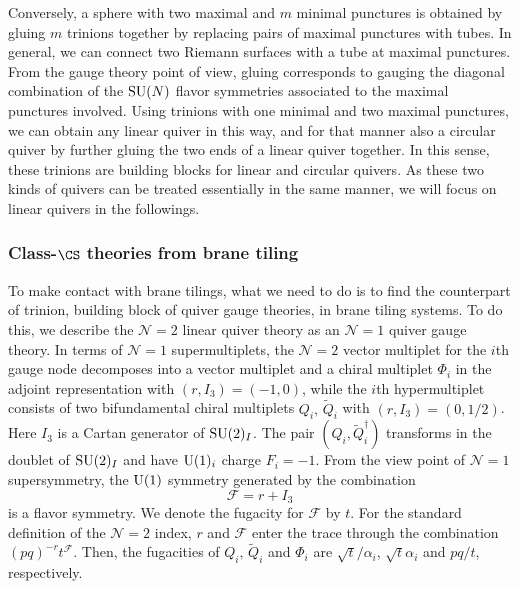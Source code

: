 Conversely, a sphere with two maximal and $m$ minimal punctures is
obtained by gluing $m$ trinions together by replacing pairs
of maximal punctures with tubes. In general, we can connect two Riemann
surfaces with a tube at maximal punctures. From the gauge theory
point of view, gluing corresponds to gauging the diagonal combination
of the $\mathrm{SU}(N)$ flavor symmetries associated to the maximal punctures
involved. Using trinions with one minimal and two maximal punctures,
we can obtain any linear quiver in this way, and for that manner also
a circular quiver by further gluing the two ends of a linear quiver
together. In this sense, these trinions are building blocks for linear
and circular quivers. As these two kinds of quivers can be treated
essentially in the same manner, we will focus on linear quivers in
the followings.





\subsubsection{Class-$\CS$ theories from brane tiling}

To make contact with brane tilings, what we need to do is to find
the counterpart of trinion, building block of quiver gauge theories,
in brane tiling systems. To do this, we describe the $\mathcal{N}=2$
linear quiver theory as an $\mathcal{N}=1$ quiver gauge theory. In
terms of $\mathcal{N}=1$ supermultiplets, the $\mathcal{N}=2$ vector
multiplet for the $i$th gauge node decomposes into a vector multiplet
and a chiral multiplet $\Phi_{i}$ in the adjoint representation with
$(r,I_{3})=(-1,0)$, while the $i$th hypermultiplet
consists of two bifundamental chiral multiplets $Q_{i},\,\tilde{Q}_{i}$
with $(r,I_{3})=(0,1/2)$. Here $I_{3}$ is
a Cartan generator of $\mathrm{SU}(2)_{I}$. The pair $(Q_{i},\tilde{Q}_{i}^{\dagger})$
transforms in the doublet of $\mathrm{SU}(2)_{I}$ and have $\mathrm{U}(1)_{i}$ charge
$F_{i}=-1$. From the view point of $\mathcal{N}=1$ supersymmetry,
the $\mathrm{U}(1)$ symmetry generated by the combination
\begin{equation}
    \mathcal{F} = r + I_{3}
\end{equation}
is a flavor symmetry. We denote the fugacity for $\mathcal{F}$ by
$t$. For the standard definition of the $\mathcal{N}=2$ index, $r$
and $\mathcal{F}$ enter the trace through the combination $(pq)^{-r}t^{\mathcal{F}}$.
Then, the fugacities of $Q_{i},\,\tilde{Q}_{i}$ and $\Phi_{i}$ are
$\sqrt{t}/\alpha_{i}$, $\sqrt{t}\alpha_{i}$ and $pq/t$, respectively.

